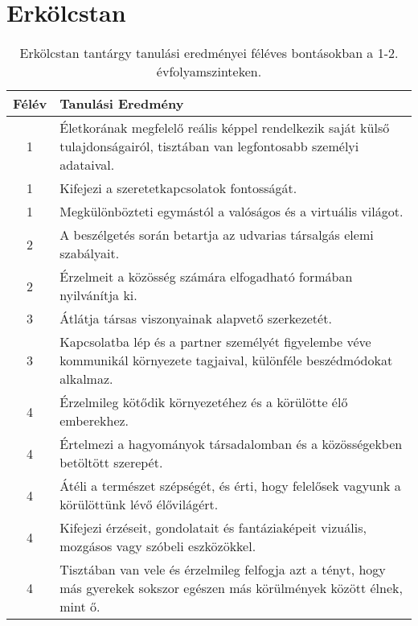         \section{Erkölcstan}

       
           \begin{longtable}{c | p{} }
            \caption[Erkölcstan 1-2.]{Erkölcstan tantárgy tanulási eredményei féléves bontásokban a 1-2. évfolyamszinteken. }  \\

            \textbf{Félév} & \textbf{Tanulási Eredmény} \\
            \hline
            \endhead
                                
                                          1 &  Életkorának megfelelő reális képpel rendelkezik saját külső tulajdonságairól, tisztában van legfontosabb személyi adataival. \\ \hline
                                          1 &  Kifejezi a szeretetkapcsolatok fontosságát. \\ \hline
                                          1 &  Megkülönbözteti egymástól a valóságos és a virtuális világot. \\ \hline
                                      
                                
                                          2 &  A beszélgetés során betartja az udvarias társalgás elemi szabályait. \\ \hline
                                          2 &  Érzelmeit a közösség számára elfogadható formában nyilvánítja ki. \\ \hline
                                      
                                
                                          3 &  Átlátja társas viszonyainak alapvető szerkezetét. \\ \hline
                                          3 &  Kapcsolatba lép és a partner személyét figyelembe véve kommunikál környezete tagjaival, különféle beszédmódokat alkalmaz. \\ \hline
                                      
                                
                                          4 &  Érzelmileg kötődik környezetéhez és a körülötte élő emberekhez. \\ \hline
                                          4 &  Értelmezi a hagyományok társadalomban és a közösségekben betöltött szerepét. \\ \hline
                                          4 &  Átéli a természet szépségét, és érti, hogy felelősek vagyunk a körülöttünk lévő élővilágért. \\ \hline
                                          4 &  Kifejezi érzéseit, gondolatait és fantáziaképeit vizuális, mozgásos vagy szóbeli eszközökkel. \\ \hline
                                          4 &  Tisztában van vele és érzelmileg felfogja azt a tényt, hogy más gyerekek sokszor egészen más körülmények között élnek, mint ő. \\ \hline
                                      

\end{longtable}
